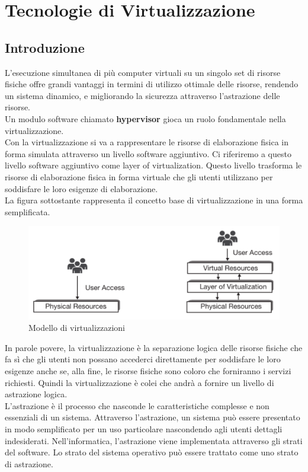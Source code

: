 \documentclass{article}
\begin{document}
\newpage
\section{Tecnologie di Virtualizzazione}
\subsection{Introduzione}
L'esecuzione simultanea di più computer virtuali su un singolo set di risorse fisiche offre grandi vantaggi in termini di utilizzo ottimale delle risorse, rendendo un sistema dinamico, e migliorando la sicurezza attraverso l'astrazione delle risorse. \\ 
Un modulo software chiamato \textbf{hypervisor} gioca un ruolo fondamentale nella virtualizzazione. \\
Con la virtualizzazione si va a rappresentare le risorse di elaborazione fisica in forma simulata attraverso un livello software aggiuntivo. Ci riferiremo a questo livello software aggiuntivo come layer of virtualization. Questo livello trasforma le risorse di elaborazione fisica in forma virtuale che gli utenti utilizzano per soddisfare le loro esigenze di elaborazione. \\
La figura sottostante rappresenta il concetto base di virtualizzazione in una forma semplificata. 
\begin{figure}[H]
    \centering
    \includegraphics[scale=0.5]{img/virtualization technologies.png}
    \caption{Modello di virtualizzazioni}
\end{figure}\noindent
In parole povere, la virtualizzazione è la separazione logica delle risorse fisiche che fa sì che gli utenti non possano accederci direttamente per soddisfare le loro esigenze anche se, alla fine, le risorse fisiche sono coloro che forniranno i servizi richiesti. Quindi la virtualizzazione è colei che andrà a fornire un livello di astrazione logica. \\
L'astrazione è il processo che nasconde le caratteristiche complesse e non essenziali di un sistema. Attraverso l'astrazione, un sistema può essere presentato in modo semplificato per un uso particolare nascondendo agli utenti dettagli indesiderati. Nell'informatica, l'astrazione viene implementata attraverso gli strati del software. Lo strato del sistema operativo può essere trattato come uno strato di astrazione. \\
\end{document}
